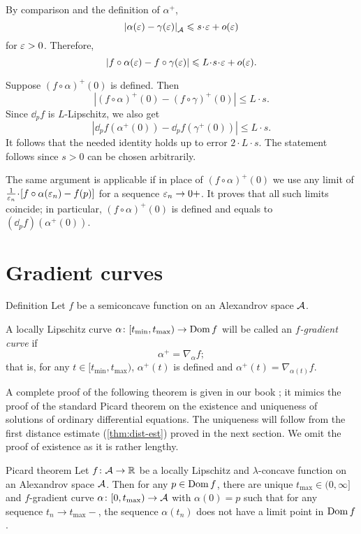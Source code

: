 By comparison and the definition of $\alpha^+$,
\[\dist{\alpha(\eps)}{\gamma(\eps)}{\spc{A}}\le s\cdot\eps+o(\eps)\]
for $\varepsilon>0$.
Therefore,
\[|f\circ\alpha(\eps)-f\circ\gamma(\eps)|\le L\cdot s\cdot\eps+o(\eps).\]

Suppose $(f\circ\alpha)^+(0)$ is defined.
Then
\[|(f\circ\alpha)^+(0)-(f\circ\gamma)^+(0)|\le L\cdot s.\]
Since $\dd_pf$ is $L$-Lipschitz, we also get 
\[|\dd_pf(\alpha^+(0))-\dd_pf(\gamma^+(0))|\le L\cdot s.\]
It follows that the needed identity holds up to error $2\cdot L\cdot s$.
The statement follows since $s>0$ can be chosen arbitrarily.

The same argument is applicable if in place of $(f\circ\alpha)^+(0)$
we use any limit of $\tfrac1{\eps_n}\cdot [f\circ\alpha(\eps_n)-f(p)]$ for a sequence $\varepsilon_n\to 0+$.
It proves that all such limits coincide; in particular, $(f\circ\alpha)^+(0)$ is defined and equals to $(\dd_pf)(\alpha^+(0))$.
\qeds


\section{Gradient curves}

\begin{thm}{Definition}\label{def:grad-curve}
Let $f$ be a semiconcave function on an Alexandrov space $\mathcal{A}$.

A locally Lipschitz curve $\alpha\colon[t_{\min},t_{\max})\to\mathop{\rm Dom}\nolimits f$ will be called an \emph{$f$-gradient curve} if
\[\alpha^+=\nabla_{\alpha} f;\]
that is, for any $t\in[t_{\min},t_{\max})$, $\alpha^+(t)$ is defined and 
$\alpha^+(t)=\nabla_{\alpha(t)} f$.
\end{thm}

A complete proof of the following theorem is given in our book \cite[16.15]{alexander-kapovitch-petrunin2024};
it mimics the proof of the standard Picard theorem on the existence  and uniqueness of solutions of ordinary differential equations.
The uniqueness will follow from the first distance estimate (\ref{thm:dist-est}) proved in the next section.
We omit the proof of existence as it is rather lengthy.

\begin{thm}{Picard theorem}\label{thm:glob-exist-grad-curv}
Let $f\colon\mathcal{A}\to \mathbb{R}$ be a locally Lipschitz and $\lambda$-concave function on an Alexandrov space $\mathcal{A}$.
Then for any $p\in \mathop{\rm Dom}\nolimits f$, there are unique $t_{\max}\in(0,\infty]$ and $f$-gradient curve $\alpha\colon[0,t_{\max})\to \mathcal{A}$ with $\alpha(0)=p$ such that for any sequence $t_n\to t_{\max}-$, the sequence $\alpha(t_n)$ does not have a limit point in $\mathop{\rm Dom}\nolimits f$.
\end{thm}

